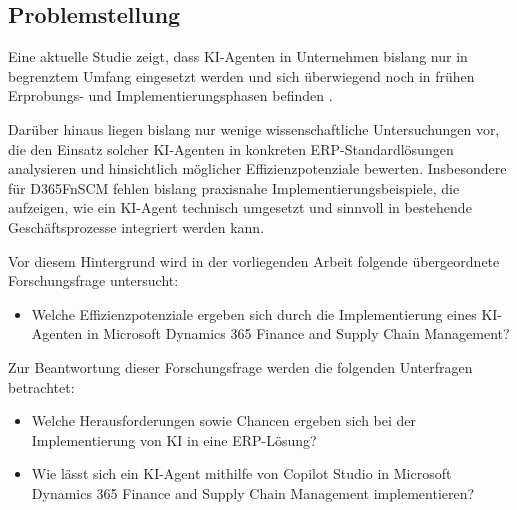 \subsection{Problemstellung}
Eine aktuelle Studie zeigt, dass \ac{KI}-Agenten in Unternehmen bislang nur in begrenztem Umfang eingesetzt werden und sich überwiegend noch in frühen Erprobungs- und Implementierungsphasen befinden \cite[\pagef 4ff]{capgemini_research_institute_rise_2025}.

Darüber hinaus liegen bislang nur wenige wissenschaftliche Untersuchungen vor, die den Einsatz solcher \ac{KI}-Agenten in konkreten \ac{ERP}-Standardlösungen analysieren und hinsichtlich möglicher Effizienzpotenziale bewerten. Insbesondere für \ac{D365FnSCM} fehlen bislang praxisnahe Implementierungsbeispiele, die aufzeigen, wie ein \ac{KI}-Agent technisch umgesetzt und sinnvoll in bestehende Geschäftsprozesse integriert werden kann.

Vor diesem Hintergrund wird in der vorliegenden Arbeit folgende übergeordnete Forschungsfrage untersucht:

\begin{itemize}
    \item Welche Effizienzpotenziale ergeben sich durch die Implementierung eines \ac{KI}-Agenten in Microsoft Dynamics 365 Finance and Supply Chain Management?
\end{itemize}

Zur Beantwortung dieser Forschungsfrage werden die folgenden Unterfragen betrachtet:

\begin{itemize}
    \item Welche Herausforderungen sowie Chancen ergeben sich bei der Implementierung von \ac{KI} in eine \ac{ERP}-Lösung?
    \item Wie lässt sich ein \ac{KI}-Agent mithilfe von Copilot Studio in Microsoft Dynamics 365 Finance and Supply Chain Management implementieren?
\end{itemize}